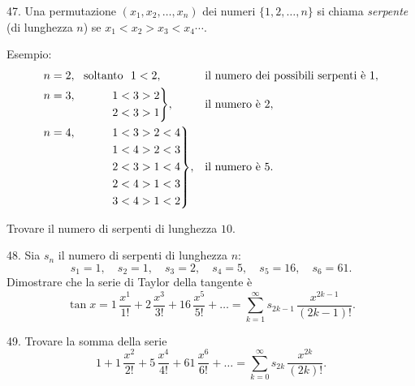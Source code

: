 \begin{problem}{47.}
	Una permutazione $(x_1,x_2, \dotsc,x_n)$ dei numeri $\{1, 2, \dotsc, n\}$ si chiama \emph{serpente} (di lunghezza $n$) se $x_1<x_2>x_3<x_4 \dotsb$.

	\begin{note}{Esempio:}
		\begin{equation*}
			\begin{aligned}[t]
				&\begin{aligned}[t] n=2, \text{\ \ soltanto\ \ } 1<2, \end{aligned} &&\text{il numero dei possibili serpenti è }1, \\
				&\hskip-\nulldelimiterspace\mathord{\left.\begin{aligned} n=3, \hphantom{\text{\ \ only\ \ }} 1&<3>2 \\
				2&<3>1\end{aligned} \right\}}, && \text{il numero è }2, \\
				&\hskip-\nulldelimiterspace\mathord{\left.\begin{aligned} n=4, \hphantom{\text{\ \ only\ \ }} 1&<3>2<4 \\
				1&<4>2<3 \\
				2&<3>1<4 \\
				2&<4>1<3 \\
				3&<4>1<2\end{aligned} \right\}},
				&&\text{il numero è }5. \\
			\end{aligned}
		\end{equation*}
	\end{note}
	Trovare il numero di serpenti di lunghezza  $10$.
\end{problem}

\begin{problem}{48.}
	Sia $s_n$ il numero di serpenti di lunghezza $n$:
	\begin{equation*}
		s_1=1, \quad s_2=1, \quad s_3=2, \quad s_4=5, \quad s_5=16, \quad s_6=61.
	\end{equation*}
	Dimostrare che la serie di Taylor della tangente è
	\begin{equation*}
		\tan x=1\, \frac{x^1}{1!}+2\, \frac{x^3}{3!}+16\, \frac{x^5}{5!}+\dots=
		\textstyle\sum\limits_{k=1}^{\infty} s_{2k-1}\, \frac{x^{2k-1}}{(2k-1)!}.
	\end{equation*}
\end{problem}

\begin{problem}{49.}
	Trovare la somma della serie
	\begin{equation*}
		1+1\, \frac{x^2}{2!}+5\, \frac{x^4}{4!}+61\, \frac{x^6}{6!}+\dots=
		\textstyle\sum\limits_{k=0}^{\infty} s_{2k}\,\frac{x^{2k}}{(2k)!}.
	\end{equation*}
\end{problem}


